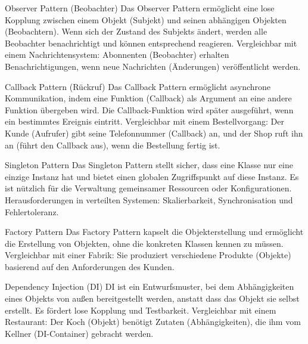 \documentclass{beamer}
\begin{document}
\begin{frame}{Observer Pattern (Beobachter)}
    Das Observer Pattern ermöglicht eine lose Kopplung zwischen einem Objekt (Subjekt) und seinen abhängigen Objekten (Beobachtern). Wenn sich der Zustand des Subjekts ändert, werden alle Beobachter benachrichtigt und können entsprechend reagieren. Vergleichbar mit einem Nachrichtensystem: Abonnenten (Beobachter) erhalten Benachrichtigungen, wenn neue Nachrichten (Änderungen) veröffentlicht werden.
\end{frame}

\begin{frame}{Callback Pattern (Rückruf)}
    Das Callback Pattern ermöglicht asynchrone Kommunikation, indem eine Funktion (Callback) als Argument an eine andere Funktion übergeben wird. Die Callback-Funktion wird später ausgeführt, wenn ein bestimmtes Ereignis eintritt. Vergleichbar mit einem Bestellvorgang: Der Kunde (Aufrufer) gibt seine Telefonnummer (Callback) an, und der Shop ruft ihn an (führt den Callback aus), wenn die Bestellung fertig ist.
\end{frame}

\begin{frame}{Singleton Pattern}
    Das Singleton Pattern stellt sicher, dass eine Klasse nur eine einzige Instanz hat und bietet einen globalen Zugriffspunkt auf diese Instanz. Es ist nützlich für die Verwaltung gemeinsamer Ressourcen oder Konfigurationen. \newline Herausforderungen in verteilten Systemen: Skalierbarkeit, Synchronisation und Fehlertoleranz.
\end{frame}

\begin{frame}{Factory Pattern}
    Das Factory Pattern kapselt die Objekterstellung und ermöglicht die Erstellung von Objekten, ohne die konkreten Klassen kennen zu müssen. Vergleichbar mit einer Fabrik: Sie produziert verschiedene Produkte (Objekte) basierend auf den Anforderungen des Kunden.
\end{frame}

\begin{frame}{Dependency Injection (DI)}
    DI ist ein Entwurfsmuster, bei dem Abhängigkeiten eines Objekts von außen bereitgestellt werden, anstatt dass das Objekt sie selbst erstellt. Es fördert lose Kopplung und Testbarkeit. Vergleichbar mit einem Restaurant: Der Koch (Objekt) benötigt Zutaten (Abhängigkeiten), die ihm vom Kellner (DI-Container) gebracht werden.
\end{frame}
\end{document}

